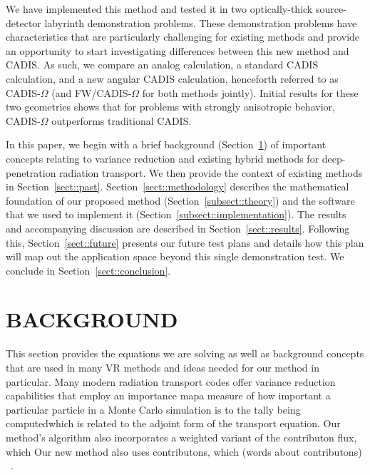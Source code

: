 \documentclass[12pt]{article}
\begin{document}
We have implemented this method and tested it in two optically-thick source-detector labyrinth demonstration problems. 
These demonstration problems have characteristics that are particularly challenging for existing methods and provide an opportunity to start investigating differences between this new method and CADIS.
As such, we compare an analog calculation, a standard CADIS calculation, and a new angular CADIS calculation, henceforth referred to as CADIS-$\Omega$ (and FW/CADIS-$\Omega$ for both methods jointly). Initial results for these two geometries shows that for problems with strongly anisotropic behavior, CADIS-$\Omega$ outperforms traditional CADIS.

In this paper, we begin with a brief background (Section~\ref{sect::second}) of important concepts relating to variance reduction and existing hybrid methods for deep-penetration radiation transport.
We then provide the context of existing methods in Section~\ref{sect::past}. 
Section~\ref{sect::methodology} describes the mathematical foundation of our proposed method (Section~\ref{subsect::theory}) and the software that we used to implement it (Section~\ref{subsect::implementation}). 
The results and accompanying discussion are described in Section~\ref{sect::results}. Following this, Section~\ref{sect::future} presents our future test plans and details how this plan will map out the application space beyond this single demonstration test. 
We conclude in Section~\ref{sect::conclusion}. 


%
\section{BACKGROUND}
\label{sect::second}

This section provides the equations we are solving as well as background concepts that are used in many VR methods and ideas needed for our method in particular. 
Many modern radiation transport codes offer variance reduction capabilities that employ an importance map\textemdash a measure of how important a particular particle in a Monte Carlo simulation is to the tally being computed\textemdash which is related to the adjoint form of the transport equation. 
Our method's algorithm also incorporates a weighted variant of the contributon flux, which 
Our new method also uses contributons, which (words about contributons) ~\cite{williams_contributorn_1992}. 
\end{document}
